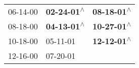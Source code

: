 \begin{supertabular}{lll}
 06-14-00\textsuperscript{} &  \textbf{02-24-01\textsuperscript{$\wedge$}} &  \textbf{08-18-01\textsuperscript{$\wedge$}} \\
 08-18-00\textsuperscript{} &  \textbf{04-13-01\textsuperscript{$\wedge$}} &  \textbf{10-27-01\textsuperscript{$\wedge$}} \\
 10-18-00\textsuperscript{} &                   05-11-01\textsuperscript{} &  \textbf{12-12-01\textsuperscript{$\wedge$}} \\
 12-16-00\textsuperscript{} &                   07-20-01\textsuperscript{} &                                              \\
\end{supertabular}
